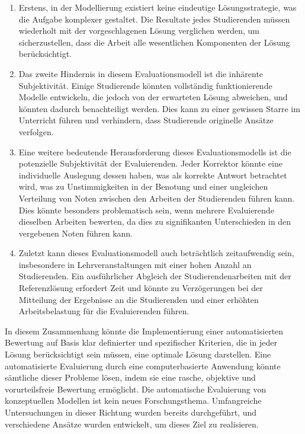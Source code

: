 \begin{enumerate}
    \item Erstens, in der Modellierung existiert keine eindeutige Lösungsstrategie, was die Aufgabe komplexer gestaltet. Die Resultate jedes Studierenden müssen wiederholt mit der vorgeschlagenen Lösung verglichen werden, um sicherzustellen, dass die Arbeit alle wesentlichen Komponenten der Lösung berücksichtigt.

    \item Das zweite Hindernis in diesem Evaluationsmodell ist die inhärente Subjektivität. Einige Studierende könnten vollständig funktionierende Modelle entwickeln, die jedoch von der erwarteten Lösung abweichen, und könnten dadurch benachteiligt werden. Dies kann zu einer gewissen Starre im Unterricht führen und verhindern, dass Studierende originelle Ansätze verfolgen.

    \item Eine weitere bedeutende Herausforderung dieses Evaluationsmodells ist die potenzielle Subjektivität der Evaluierenden. Jeder Korrektor könnte eine individuelle Auslegung dessen haben, was als korrekte Antwort betrachtet wird, was zu Unstimmigkeiten in der Benotung und einer ungleichen Verteilung von Noten zwischen den Arbeiten der Studierenden führen kann. Dies könnte besonders problematisch sein, wenn mehrere Evaluierende dieselben Arbeiten bewerten, da dies zu signifikanten Unterschieden in den vergebenen Noten führen kann.

    \item Zuletzt kann dieses Evaluationsmodell auch beträchtlich zeitaufwendig sein, insbesondere in Lehrveranstaltungen mit einer hohen Anzahl an Studierenden. Ein ausführlicher Abgleich der Studierendenarbeiten mit der Referenzlösung erfordert Zeit und könnte zu Verzögerungen bei der Mitteilung der Ergebnisse an die Studierenden und einer erhöhten Arbeitsbelastung für die Evaluierenden führen.
\end{enumerate}
    

In diesem Zusammenhang könnte die Implementierung einer automatisierten Bewertung auf Basis klar definierter und spezifischer Kriterien, die in jeder Lösung berücksichtigt sein müssen, eine optimale Lösung darstellen. Eine automatisierte Evaluierung durch eine computerbasierte Anwendung könnte sämtliche dieser Probleme lösen, indem sie eine rasche, objektive und vorurteilsfreie Bewertung ermöglicht. Die automatische Evaluierung von \gls{konzeptuellen Modellen} ist kein neues Forschungsthema. Umfangreiche Untersuchungen in dieser Richtung wurden bereits durchgeführt, und verschiedene Ansätze wurden entwickelt, um dieses Ziel zu realisieren.

